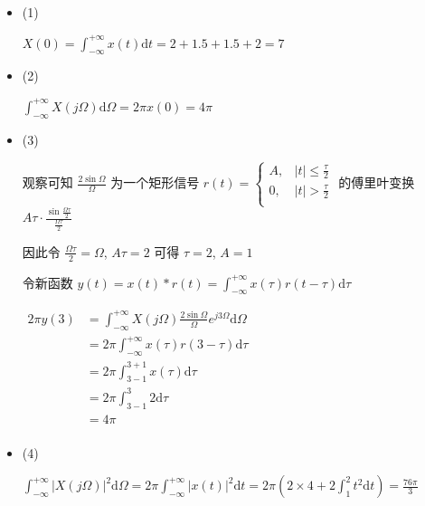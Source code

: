 \documentclass[a4paper,UTF8]{article}
\numberwithin{equation}{section}
\begin{document}
\begin{framed}
\begin{spacing}{1.5}
    \begin{itemize}
      \item (1)

      $\displaystyle X(0) = \int_{-\infty}^{+\infty}x(t)\mathrm{d}t = 2 + 1.5 + 1.5 + 2 = 7$
      
      \item (2)
      
      $\displaystyle \int_{-\infty}^{+\infty}X(j\Omega)\mathrm{d}\Omega = 2\pi x(0) = 4\pi$
      
      \item (3)
      
      观察可知 $\displaystyle \frac{2\sin \Omega}{\Omega}$ 为一个矩形信号 $r(t) = \begin{cases}
          A, & |t| \le \frac{\tau}{2} \\
          0, & |t| > \frac{\tau}{2} \\
      \end{cases}$ 的傅里叶变换 $\displaystyle A\tau \cdot \frac{\sin \frac{\Omega \tau}{2}}{\frac{\Omega \tau}{2}}$
      
      因此令 $\displaystyle \frac{\Omega\tau}{2} = \Omega$, $A\tau = 2$ 可得 $\tau = 2$, $A = 1$
      
      令新函数 $\displaystyle y(t) = x(t) * r(t) = \int_{-\infty}^{+\infty}x(\tau)r(t-\tau)\mathrm{d}\tau$
      
      $
      \begin{aligned}
      \displaystyle 2\pi y(3) & = \int_{-\infty}^{+\infty}X(j\Omega)\frac{2\sin \Omega}{\Omega}e^{j 3\Omega}\mathrm{d}\Omega  \\
      & = 2\pi \int_{-\infty}^{+\infty}x(\tau)r(3-\tau)\mathrm{d}\tau  \\
      & = 2\pi \int_{3-1}^{3+1}x(\tau)\mathrm{d}\tau  \\
      & = 2\pi \int_{3-1}^{3}2\mathrm{d}\tau  \\
      & = 4 \pi  \\
      \end{aligned}
      $
      
      \item (4)
      
      $\displaystyle \int_{-\infty}^{+\infty}|X(j\Omega)|^{2}\mathrm{d}\Omega = 2\pi \int_{-\infty}^{+\infty}|x(t)|^{2}\mathrm{d}t = 2\pi(2 \times 4 + 2\int_{1}^{2}t^{2} \mathrm{d}t ) = \frac{76 \pi}{3}$
    \end{itemize}
\end{spacing}
\end{framed}
\end{document}
